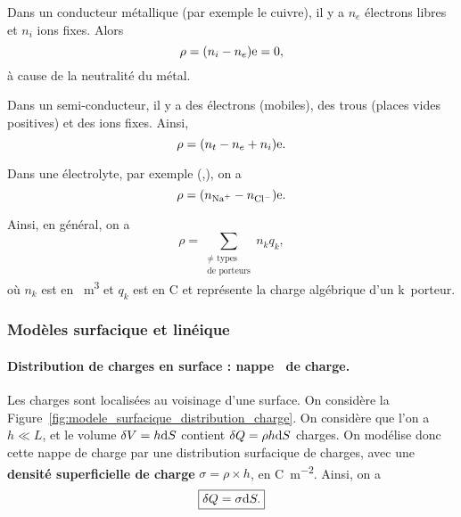             \begin{example}
                Dans un conducteur métallique (par exemple le cuivre), il y a $n_e$ électrons libres et $n_i$ ions fixes. Alors 
                \begin{equation*}
                    \rho=(n_i-n_e)\mathrm{e}=0,
                \end{equation*}
                à cause de la neutralité du métal.
            \end{example}
            \begin{example}
                Dans un semi-conducteur, il y a des électrons (mobiles), des trous (places vides positives) et des ions fixes. Ainsi,
                \begin{equation*}
                    \rho=(n_t-n_e+n_i)\mathrm{e}.
                \end{equation*}
            \end{example}
            \begin{example}
                Dans une électrolyte, par exemple (,), on a 
                \begin{equation*}
                    \rho=(n_{\ce{Na+}}-n_{\ce{Cl-}})\e.
                \end{equation*}
            \end{example}

            Ainsi, en général, on a
            \begin{equation*}
                \rho=\sum_{\substack{\neq\text{ types}\\\text{de porteurs}}}n_{k}q_{k},
            \end{equation*}
            où $n_k$ est en \si{\per\metre\cubed} et $q_k$ est en \si{\coulomb} et représente la charge algébrique d'un \og k\fg~porteur.

        \subsubsection{Modèles surfacique et linéique}

            \paragraph{Distribution de charges en surface : \og nappe\fg~ de charge.}

                Les charges sont localisées au voisinage d'une surface. On considère la Figure~\ref{fig:modele_surfacique_distribution_charge}. On considère que l'on a $h\ll L$, et le volume $\delta V=h\mathrm{d} S$ contient $\delta Q=\rho h\mathrm{d} S$ charges. On modélise donc cette nappe de charge par une distribution surfacique de charges, avec une \textbf{densité superficielle de charge} $\sigma=\rho\times h$, en \si{\coulomb\per\metre\squared}. Ainsi, on a 
                \begin{equation*}
                    \boxed{
                        \delta Q=\sigma\mathrm{d} S.
                    }
                \end{equation*}


